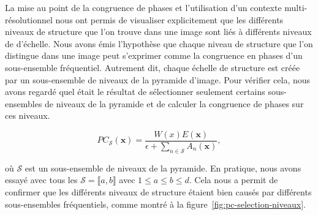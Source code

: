 La mise au point de la congruence de phases et l'utilisation d'un contexte multi-résolutionnel nous ont permis de visualiser explicitement que les différents niveaux de structure que l'on trouve dans une image sont liés à différents niveaux de d'échelle. Nous avons émis l'hypothèse que chaque niveau de structure que l'on distingue dans une image peut s'exprimer comme la congruence en phases d'un sous-ensemble fréquentiel. Autrement dit, chaque échelle de structure est créée par un sous-ensemble de niveaux de la pyramide d'image. Pour vérifier cela, nous avons regardé quel était le résultat de sélectionner seulement certains sous-ensembles de niveaux de la pyramide et de calculer la congruence de phases sur ces niveaux.

\begin{equation}
    PC_{\mathcal{S}}(\mathbf{x}) = \frac{W(x)E(\mathbf{x})}{\epsilon + \sum_{n\in\mathcal{S}} A_{n}(\mathbf{x})},
\end{equation}

où $\mathcal{S}$ est un sous-ensemble de niveaux de la pyramide. En pratique, nous avons essayé avec tous les $\mathcal{S} = \llbracket a, b\rrbracket$ avec $1 \leq a \leq b \leq d$. Cela nous a permit de confirmer que les différents niveaux de structure étaient bien causés par différents sous-ensembles fréquentiels, comme montré à la figure~\ref{fig:pc-selection-niveaux}.

\bigskip

